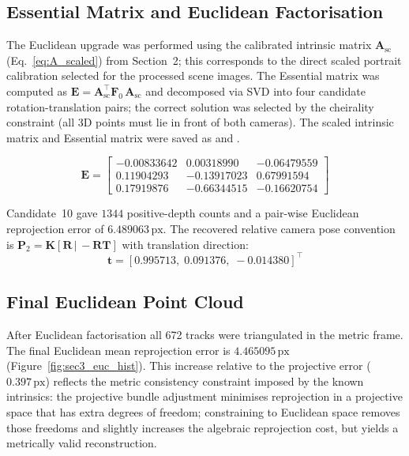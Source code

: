 \documentclass[11pt,a4paper]{article}
\begin{document}
\subsection{Essential Matrix and Euclidean Factorisation}
\label{sec:sec3_euclidean}

The Euclidean upgrade was performed using the calibrated intrinsic matrix
$\mathbf{A}_\mathrm{sc}$ (Eq.~\eqref{eq:A_scaled}) from Section~2; this
corresponds to the direct scaled portrait calibration selected for the
processed scene images.
The Essential matrix was computed as $\mathbf{E} = \mathbf{A}_\mathrm{sc}^\top
\mathbf{F}_0\,\mathbf{A}_\mathrm{sc}$ and decomposed via SVD into four candidate
rotation-translation pairs; the correct solution was selected by the cheirality
constraint (all 3D points must lie in front of both cameras).
The scaled intrinsic matrix and Essential matrix were saved as
 and
.

\begin{equation}
\mathbf{E} =
\begin{bmatrix}
-0.00833642 &  0.00318990 & -0.06479559 \\
 0.11904293 & -0.13917023 &  0.67991594 \\
 0.17919876 & -0.66344515 & -0.16620754
\end{bmatrix}
\label{eq:sec3_E}
\end{equation}

Candidate~10 gave $1344$ positive-depth counts and a pair-wise Euclidean
reprojection error of $6.489063\,\mathrm{px}$.
The recovered relative camera pose convention is
$\mathbf{P}_2 = \mathbf{K}[\mathbf{R}\,|\,-\mathbf{R}\mathbf{T}]$ with translation
direction:
\begin{equation}
\mathbf{t} = [0.995713,\; 0.091376,\; -0.014380]^\top
\label{eq:sec3_t}
\end{equation}

\subsection{Final Euclidean Point Cloud}
\label{sec:sec3_cloud}

After Euclidean factorisation all 672 tracks were triangulated in the metric frame.
The final Euclidean mean reprojection error is $4.465095\,\mathrm{px}$
(Figure~\ref{fig:sec3_euc_hist}).  This increase relative to the projective error
($0.397\,\mathrm{px}$) reflects the metric consistency constraint imposed by the
known intrinsics: the projective bundle adjustment minimises reprojection in a
projective space that has extra degrees of freedom; constraining to Euclidean space
removes those freedoms and slightly increases the algebraic reprojection cost, but
yields a metrically valid reconstruction.
\end{document}
